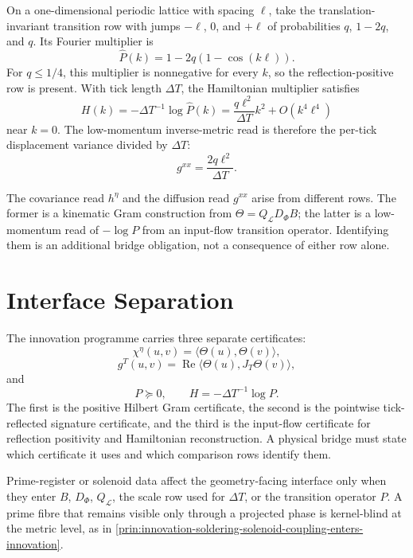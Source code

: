 \begin{example}
\label{ex:innovation-input-nearest-neighbour-diffusion-witness}
On a one-dimensional periodic lattice with spacing $\ell$, take the
translation-invariant transition row with jumps $-\ell$, $0$, and
$+\ell$ of probabilities $q$, $1-2q$, and $q$. Its Fourier multiplier is
$$
\widehat P(k)=1-2q(1-\cos(k\ell)).
$$
For $q\le1/4$, this multiplier is nonnegative for every $k$, so the
reflection-positive row is present. With tick length $\Delta T$, the
Hamiltonian multiplier satisfies
$$
H(k)
=
-\Delta T^{-1}\log\widehat P(k)
=
\frac{q\ell^2}{\Delta T}k^2+O(k^4\ell^4)
$$
near $k=0$. The low-momentum inverse-metric read is therefore the
per-tick displacement variance divided by $\Delta T$:
$$
g^{xx}=\frac{2q\ell^2}{\Delta T}.
$$
\end{example}

\begin{principle}
\label{prin:innovation-input-two-metric-engines}
The covariance read $h^\eta$ and the diffusion read $g^{xx}$ arise from
different rows. The former is a kinematic Gram construction from
$\Theta=Q_{\mathcal L}D_\Phi B$; the latter is a low-momentum read of
$-\log P$ from an input-flow transition operator. Identifying them is an
additional bridge obligation, not a consequence of either row alone.
\end{principle}

\section{Interface Separation}
\label{sec:innovation-input-interface-separation}

\begin{principle}
\label{prin:innovation-input-three-certificates}
The innovation programme carries three separate certificates:
$$
\chi^\eta(u,v)=\langle\Theta(u),\Theta(v)\rangle,
$$
$$
g^T(u,v)=\operatorname{Re}\langle\Theta(u),J_T\Theta(v)\rangle,
$$
and
$$
P\succeq0,\qquad H=-\Delta T^{-1}\log P.
$$
The first is the positive Hilbert Gram certificate, the second is the
pointwise tick-reflected signature certificate, and the third is the
input-flow certificate for reflection positivity and Hamiltonian
reconstruction. A physical bridge must state which certificate it uses and
which comparison rows identify them.
\end{principle}

\begin{principle}
\label{prin:innovation-input-prime-register-visible-row}
Prime-register or solenoid data affect the geometry-facing interface only
when they enter $B$, $D_{\Phi}$, $Q_{\mathcal L}$, the scale row used for
$\Delta T$, or the transition operator $P$. A prime fibre that remains
visible only through a projected phase is kernel-blind at the metric level,
as in
\autoref{prin:innovation-soldering-solenoid-coupling-enters-innovation}.
\end{principle}

